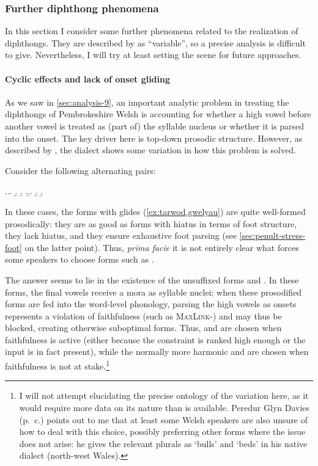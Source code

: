 \subsubsection{Further diphthong phenomena}
\label{sec:furth-diphth-phen}

In this section I consider some further phenomena related to the realization of diphthongs. They are described by \citet{awbery86:_pembr_welsh} as \enquote{variable}, so a precise analysis is difficult to give. Nevertheless, I will try at least setting the scene for future approaches.

\paragraph{Cyclic effects and lack of onset gliding}
\label{sec:cyclic-effects-lack}

As we saw in \cref{sec:analysis-9}, an important analytic problem in treating the diphthongs of Pembrokeshire Welsh is accounting for whether a high vowel before another vowel is treated as (part of) the syllable nucleus or whether it is parsed into the onset. The key driver here is top\hyp down prosodic structure. However, as described by \citet{awbery86:_pembr_welsh}, the dialect shows some variation in how this problem is solved.

Consider the following alternating pairs:

\ex.\a.\a.
\b.
\b.\label{ex:tarwod}\mbi{[ˈtarwod]}
\z.\b.\a.
\b.\mbi{[ɡweˈliːe]}
\b.\label{gwelyau}


In these cases, the forms with glides (\cref{ex:tarwod,gwelyau}) are quite well-formed prosodically: they are as good as forms with hiatus in terms of foot structure, they lack hiatus, and they ensure exhaustive foot parsing (see \cref{sec:penult-stress-foot} on the latter point). Thus, \emph{prima facie} it is not entirely clear what forces some speakers to choose forms such as \ipa{[taˈruːod]}.

The answer seems to lie in the existence of the unsuffixed forms \ipa{[ˈtaːru]} and \ipa{[ˈɡweːli]}. In these forms, the final vowels receive a mora as syllable nuclei; when these prosodified forms are fed into the word-level phonology, parsing the high vowels as onsets represents a violation of faithfulness (such as \textsc{MaxLink}-\mo) and may thus be blocked, creating otherwise suboptimal forms. Thus, \ipa{[taˈruːod]} and \ipa{[ɡweˈliːe]} are chosen when faithfulness is active (either because the constraint is ranked high enough or the input is in fact present), while the normally more harmonic \ipa{[ˈtarwod]} and \ipa{[ˈɡwelje]} are chosen when faithfulness is not at stake.\footnote{I will not attempt elucidating the precise ontology of the variation here, as it would require more data on its nature than is available. Peredur Glyn Davies (p.~c.) points out to me that at least some Welsh speakers are also unsure of how to deal with this choice, possibly preferring other forms where the issue does not arise: he gives the relevant plurals as \ipa{[ˈteiru]} `bulls' and \ipa{[ɡweˈlaːɨ]} `beds' in his native dialect (north\hyp west Wales).}

